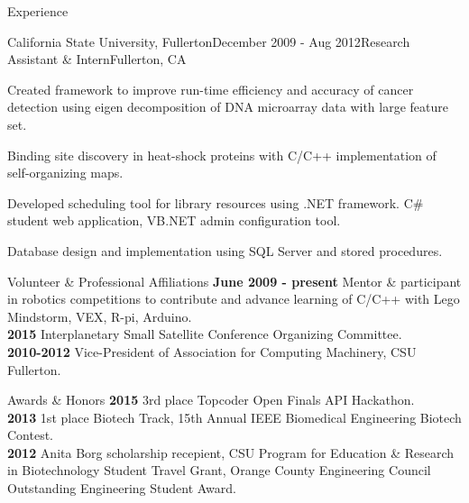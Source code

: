 \documentclass{resume} %
\begin{document}
\begin{rSection}{Experience}
\begin{rSubsection}{California State University, Fullerton}{December 2009 - Aug 2012}{Research Assistant \& Intern}{Fullerton, CA}
\item Created framework to improve run-time efficiency and accuracy of cancer detection using eigen decomposition of DNA microarray data with large feature set.
\item Binding site discovery in heat-shock proteins with C/C++ implementation of self-organizing maps.
\item Developed scheduling tool for library resources using .NET framework. C\# student web application, VB.NET admin configuration tool.
\item Database design and implementation using SQL Server and stored procedures.
\end{rSubsection}

\end{rSection}


\begin{rSection}{Volunteer \& Professional Affiliations}
{\bf June 2009 - present}  Mentor \& participant in robotics competitions to contribute and advance learning of C/C++ with Lego Mindstorm, VEX, R-pi, Arduino.  \\
{\bf 2015 } Interplanetary Small Satellite Conference Organizing Committee. \\
{\bf 2010-2012} Vice-President of Association for Computing Machinery, CSU Fullerton. 
\end{rSection}




\begin{rSection}{Awards \& Honors}
{\bf 2015}  3rd place Topcoder Open Finals API Hackathon. \\
{\bf 2013}  1st place Biotech Track, 15th Annual IEEE Biomedical Engineering Biotech Contest. \\
{\bf 2012} Anita Borg scholarship recepient, CSU Program for Education \& Research in Biotechnology Student Travel Grant, Orange County Engineering Council Outstanding Engineering Student Award. \\
\end{rSection}
\end{document}
